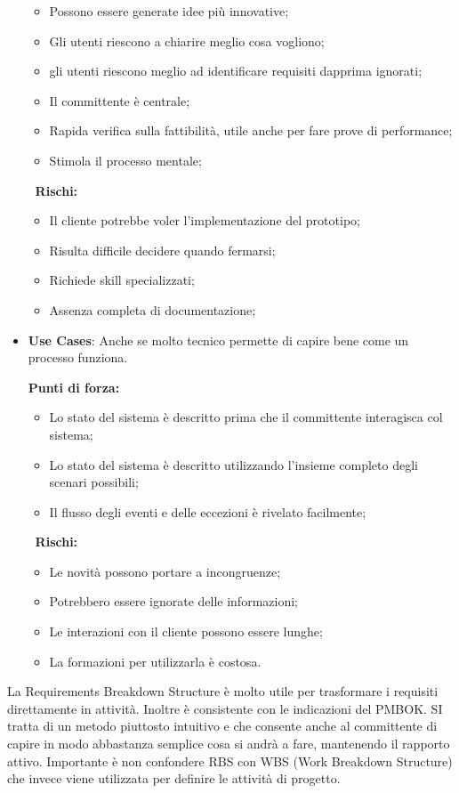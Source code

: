 \begin{itemize}
\begin{info}[]
\begin{itemize}
			\item Possono essere generate idee più innovative;
			\item Gli utenti riescono a chiarire meglio cosa vogliono;
			\item gli utenti riescono meglio ad identificare requisiti dapprima ignorati;
			\item Il committente è centrale;
			\item Rapida verifica sulla fattibilità, utile anche per fare prove di performance;
			\item Stimola il processo mentale;
		\end{itemize}
		$\;\;$\textbf{Rischi:}
		\begin{itemize}
			\item Il cliente potrebbe voler l'implementazione del prototipo;
			\item Risulta difficile decidere quando fermarsi;
			\item Richiede skill specializzati;
			\item Assenza completa di documentazione;
		\end{itemize}
	\end{info}
	\item \textbf{Use Cases}: Anche se molto tecnico permette di capire bene come un processo funziona.
	\begin{info}[]
		\textbf{Punti di forza:}
		\begin{itemize}
			\item Lo stato del sistema è descritto prima che il committente interagisca col sistema;
			\item Lo stato del sistema è descritto utilizzando l'insieme completo degli scenari possibili;
			\item Il flusso degli eventi e delle eccezioni è rivelato facilmente;
		\end{itemize}
		$\;\;$\textbf{Rischi:}
		\begin{itemize}
			\item Le novità possono portare a incongruenze;
			\item Potrebbero essere ignorate delle informazioni;
			\item Le interazioni con il cliente possono essere lunghe;
			\item La formazioni per utilizzarla è costosa.
		\end{itemize}
	\end{info}
\end{itemize}
La Requirements Breakdown Structure è molto utile per trasformare i requisiti direttamente in attività. Inoltre è consistente con le indicazioni del PMBOK. SI tratta di un metodo piuttosto intuitivo e che consente anche al committente di capire in modo abbastanza semplice cosa si andrà a fare, mantenendo il rapporto attivo. Importante è non confondere RBS con WBS (Work Breakdown Structure) che invece viene utilizzata per definire le attività di progetto.\newline
